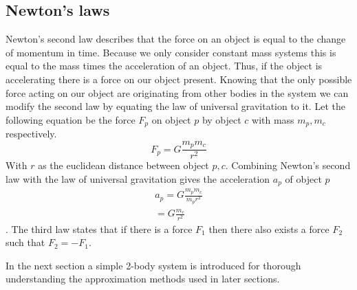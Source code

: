 \documentclass[11pt]{article} %
\begin{document}
\subsection{Newton's laws}
Newton's second law describes that the force on an object is equal to the change of momentum in time. Because we only consider constant mass systems this is equal to the mass times the acceleration of an object. Thus, if the object is accelerating there is a force on our object present. Knowing that the only possible force acting on our object are originating from other bodies in the system we can modify the second law by equating the law of universal gravitation to it. Let the following equation be the force $F_p$ on object $p$ by object $c$ with mass $m_p,m_c$ respectively.   
\begin{equation}
    \label{eq:newtongravity}
 F_p = G\frac{m_pm_c}{r^2}
\end{equation}
With $r$ as the euclidean distance between object $p,c$. Combining Newton's second law with the law of universal gravitation gives the acceleration $a_p$ of object $p$
\begin{equation}
    \label{eq:newtongravity}
    \begin{split}
	a_p = G\frac{m_pm_c}{ m_pr^2} \\
	= G\frac{m_c}{r^2}
    \end{split}
\end{equation}.
The third law states that if there is a force $F_1$ then there also exists a force $F_2$ such that $F_2 = - F_1$. 

In the next section a simple 2-body system is introduced for thorough understanding the approximation methods used in later sections.
\end{document}
